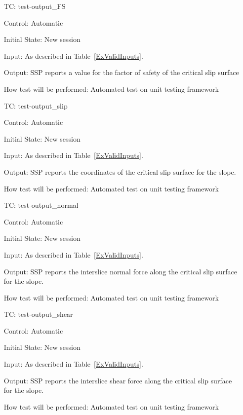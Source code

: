 \documentclass[12pt, titlepage]{article}
\newcounter{testnum} %
\newcommand{\progname}{SSP}
\begin{document}
\begin{enumerate}[label=TC\arabic*:,ref={\arabic*}]

\item [TC\refstepcounter{testnum}\thetestnum: \label{TC_OutFS}] 
test-output\_FS

Control: Automatic

Initial State: New session

Input: As described in Table~\ref{ExValidInputs}.

Output: \progname{} reports a value for the factor of safety of the critical 
slip surface

How test will be performed: Automated test on unit testing framework

\item [TC\refstepcounter{testnum}\thetestnum: \label{TC_OutSlip}] 
test-output\_slip

Control: Automatic

Initial State: New session

Input: As described in Table~\ref{ExValidInputs}.

Output: \progname{} reports the coordinates of the critical slip surface for 
the slope.

How test will be performed: Automated test on unit testing framework

\item [TC\refstepcounter{testnum}\thetestnum: \label{TC_OutNormal}] 
test-output\_normal

Control: Automatic

Initial State: New session

Input: As described in Table~\ref{ExValidInputs}.

Output: \progname{} reports the interslice normal force along the critical slip 
surface for the slope.

How test will be performed: Automated test on unit testing framework

\item [TC\refstepcounter{testnum}\thetestnum: \label{TC_OutShear}] 
test-output\_shear

Control: Automatic

Initial State: New session

Input: As described in Table~\ref{ExValidInputs}.

Output: \progname{} reports the interslice shear force along the critical slip 
surface for the slope.

How test will be performed: Automated test on unit testing framework
	
\end{enumerate}
\end{document}
